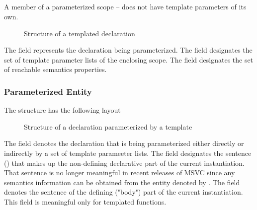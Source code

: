 

\subsection{}
\label{sec:ifc:DeclSort:Temploid}

A member of a parameterized scope -- does not have template parameters of its own.
%
\begin{figure}[H]
	\centering
	\caption{Structure of a templated declaration}
	\label{fig:ifc-type-temploid-structure}
\end{figure}
%
The  field represents the declaration being parameterized.
The  field designates the set of template parameter lists of the enclosing scope.
The  field designates the set of reachable semantics properties.



\subsubsection{Parameterized Entity}
\label{sec:ifc-parameterized-entity}

The structure  has the following layout
%
\begin{figure}[H]
	\centering
	\caption{Structure of a declaration parameterized by a template}
	\label{fig:ifc-parameterized-decl-structure}
\end{figure}
%
The  field denotes the declaration that is being 
parameterized either directly or indirectly by a set of template parameeter lists.
The  field designates the sentence () that makes up the
non-defining declarative part of the current instantiation.
That sentence is no longer meaningful in recent releases of MSVC since
any semantics information can be obtained from the entity denoted
by .
The  field denotes the sentence of the defining ("body") part
of the current instantiation.  This field is meaningful only
for templated functions. 


